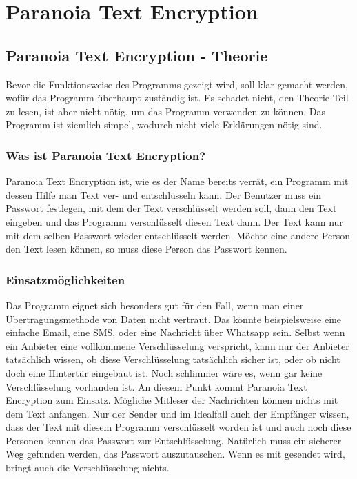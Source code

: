 \documentclass[12pt,a4paper]{scrreprt}
\begin{document}
\part{Paranoia Text Encryption}

\chapter{Paranoia Text Encryption - Theorie}
Bevor die Funktionsweise des Programms gezeigt wird, soll klar gemacht werden, wofür das Programm überhaupt zuständig ist. Es schadet nicht, den Theorie-Teil zu lesen, ist aber nicht nötig, um das Programm verwenden zu können. Das Programm ist ziemlich simpel, wodurch nicht viele Erklärungen nötig sind.

\section{Was ist Paranoia Text Encryption?}
Paranoia Text Encryption ist, wie es der Name bereits verrät, ein Programm mit dessen Hilfe man Text ver- und entschlüsseln kann. Der Benutzer muss ein Passwort festlegen, mit dem der Text verschlüsselt werden soll, dann den Text eingeben und das Programm verschlüsselt diesen Text dann. Der Text kann nur mit dem selben Passwort wieder entschlüsselt werden. Möchte eine andere Person den Text lesen können, so muss diese Person das Passwort kennen.

\section{Einsatzmöglichkeiten}
Das Programm eignet sich besonders gut für den Fall, wenn man einer Übertragungsmethode von Daten nicht vertraut. Das könnte beispielsweise eine einfache Email, eine SMS, oder eine Nachricht über Whatsapp sein. Selbst wenn ein Anbieter eine vollkommene Verschlüsselung verspricht, kann nur der Anbieter tatsächlich wissen, ob diese Verschlüsselung tatsächlich sicher ist, oder ob nicht doch eine Hintertür eingebaut ist. Noch schlimmer wäre es, wenn gar keine Verschlüsselung vorhanden ist. An diesem Punkt kommt Paranoia Text Encryption zum Einsatz. Mögliche Mitleser der Nachrichten können nichts mit dem Text anfangen. Nur der Sender und im Idealfall auch der Empfänger wissen, dass der Text mit diesem Programm verschlüsselt worden ist und auch noch diese Personen kennen das Passwort zur Entschlüsselung. Natürlich muss ein sicherer Weg gefunden werden, das Passwort auszutauschen. Wenn es mit gesendet wird, bringt auch die Verschlüsselung nichts.
\end{document}
